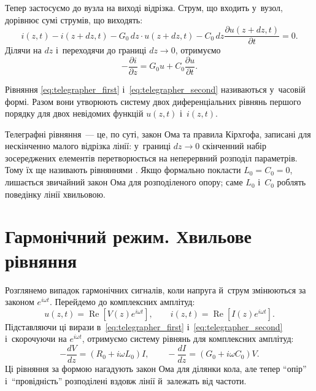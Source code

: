 Тепер застосуємо  до вузла на виході відрізка. Струм, що входить у~вузол, дорівнює сумі струмів, що виходять:
\begin{equation}\label{eq:telegrapher_KCL}
	i(z,t) - i(z+dz,t) - G_0\,dz \cdot u(z+dz,t) - C_0\,dz \frac{\partial u(z+dz,t)}{\partial t} = 0.
\end{equation}
Ділячи на $dz$ і~переходячи до границі $dz \to 0$, отримуємо
\begin{equation}\label{eq:telegrapher_second}
	-\frac{\partial i}{\partial z} = G_0 u + C_0 \frac{\partial u}{\partial t}.
\end{equation}

Рівняння \eqref{eq:telegrapher_first} і~\eqref{eq:telegrapher_second} називаються  у~часовій формі. Разом вони утворюють систему двох диференціальних рівнянь першого порядку для двох невідомих функцій $u(z,t)$ і~$i(z,t)$.

Телеграфні рівняння~--- це, по суті, закон Ома та правила Кірхгофа, записані для нескінченно малого відрізка лінії: у~границі $dz \to 0$ скінченний набір зосереджених елементів перетворюється на неперервний розподіл параметрів. Тому їх ще називають рівняннями . Якщо формально покласти $L_0 = C_0 = 0$, лишається звичайний закон Ома для розподіленого опору; саме $L_0$ і~$C_0$ роблять поведінку лінії хвильовою.

\section{Гармонічний режим. Хвильове рівняння}\hypertarget{harmonic-regime-wave-equation}{}

Розглянемо випадок гармонічних сигналів, коли напруга й~струм змінюються за законом $e^{i\omega t}$. Перейдемо до комплексних амплітуд:
\begin{equation}\label{eq:harmonic_ansatz}
	u(z,t) = \operatorname{Re}\!\left[V(z) e^{i\omega t}\right], \qquad
	i(z,t) = \operatorname{Re}\!\left[I(z) e^{i\omega t}\right].
\end{equation}
Підставляючи ці вирази в~\eqref{eq:telegrapher_first} і~\eqref{eq:telegrapher_second} і~скорочуючи на $e^{i\omega t}$, отримуємо систему рівнянь для комплексних амплітуд:
\begin{equation}\label{eq:telegrapher_freq}
	-\frac{dV}{dz} = (R_0 + i\omega L_0) I, \qquad
	-\frac{dI}{dz} = (G_0 + i\omega C_0) V.
\end{equation}
Ці рівняння за формою нагадують закон Ома для ділянки кола, але тепер \enquote{опір} і~\enquote{провідність} розподілені вздовж лінії й~залежать від частоти.

